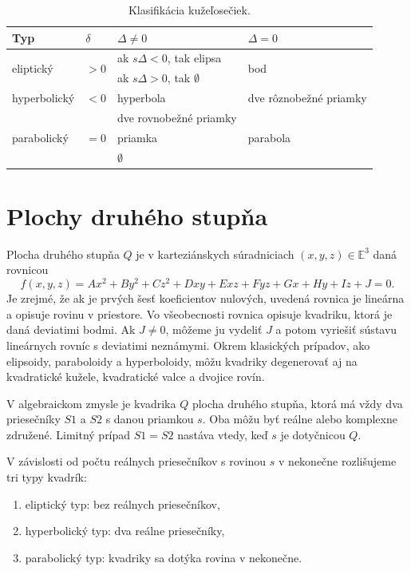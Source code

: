 \begin{table}[h]
\centering
\begin{tabular}{|l|l|l|l|}
\hline
\textbf{Typ} & $\delta$ & $\Delta \neq  0$ & $\Delta = 0 $ \\
\hline
\multirow{2}{*}{eliptický} & \multirow{2}{*}{$> 0$} & ak $s\Delta < 0$, tak elipsa & \multirow{2}{*}{bod} \\
& & ak $s\Delta > 0$, tak $\emptyset$ & \\
\hline
hyperbolický & $< 0$ & hyperbola & dve rôznobežné priamky \\
\hline
\multirow{3}{*}{parabolický} & \multirow{3}{*}{$= 0$} & dve rovnobežné priamky & \multirow{3}{*}{parabola} \\
& & priamka & \\
& & $\emptyset$ & \\
\hline
\end{tabular}
\caption{Klasifikácia kužeľosečiek.}
\label{tab:conic_sections}
\end{table}

\section{Plochy druhého stupňa}
Plocha druhého stupňa $Q$ je v karteziánskych súradniciach $(x, y, z) \in \mathbb{E}^3$ daná rovnicou
\[ f(x, y, z) = Ax^2 + By^2 + Cz^2 + Dxy + Exz + Fyz + Gx + Hy + Iz + J = 0. \]
Je zrejmé, že ak je prvých šesť koeficientov nulových, uvedená rovnica je lineárna a opisuje rovinu v priestore. Vo všeobecnosti rovnica opisuje kvadriku, ktorá je daná deviatimi bodmi. Ak $J \neq 0$, môžeme ju vydeliť $J$ a potom vyriešiť sústavu lineárnych rovníc s deviatimi neznámymi. Okrem klasických prípadov, ako elipsoidy, paraboloidy a hyperboloidy, môžu kvadriky degenerovať aj na kvadratické kužele, kvadratické valce a dvojice rovín.

V algebraickom zmysle je kvadrika $Q$ plocha druhého stupňa, ktorá má vždy dva priesečníky $S1$ a $S2$ s danou priamkou $s$. Oba môžu byť reálne alebo komplexne združené. Limitný prípad $S1 = S2$ nastáva vtedy, keď $s$ je dotyčnicou $Q$.

V závislosti od počtu reálnych priesečníkov s rovinou $s$ v nekonečne rozlišujeme tri typy kvadrík:
\begin{enumerate}
\item eliptický typ: bez reálnych priesečníkov,
\item hyperbolický typ: dva reálne priesečníky,
\item parabolický typ: kvadriky sa dotýka rovina v nekonečne.
\end{enumerate}
